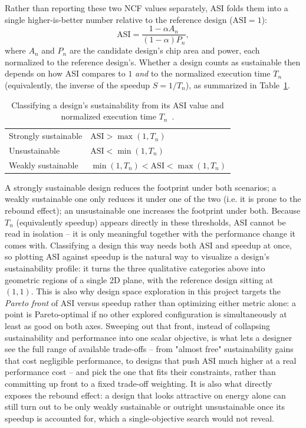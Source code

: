 \documentclass[12pt,a4paper,faculty=ea,language=en]{ugent-doc}
\begin{document}
Rather than reporting these two NCF values separately, ASI folds them into a single higher-is-better number relative to the reference design ($\mathrm{ASI} = 1$):
\begin{equation}
    \mathrm{ASI} = \frac{1 - \alpha A_n}{(1-\alpha) P_n},
\end{equation}
where $A_n$ and $P_n$ are the candidate design's chip area and power, each normalized to the reference design's. Whether a design counts as sustainable then depends on how ASI compares to $1$ \emph{and} to the normalized execution time $T_n$ (equivalently, the inverse of the speedup $S = 1/T_n$), as summarized in Table~\ref{tab:asi-regions}.

\begin{table}[H]
    \centering
    \begin{tabular}{ll}
        \toprule
        Strongly sustainable & $\mathrm{ASI} > \max(1, T_n)$ \\
        Unsustainable & $\mathrm{ASI} < \min(1, T_n)$ \\
        Weakly sustainable & $\min(1, T_n) < \mathrm{ASI} < \max(1, T_n)$ \\
        \bottomrule
    \end{tabular}
    \caption{Classifying a design's sustainability from its ASI value and normalized execution time $T_n$~\cite{asi2026}.}
    \label{tab:asi-regions}
\end{table}

A strongly sustainable design reduces the footprint under both scenarios; a weakly sustainable one only reduces it under one of the two (i.e. it is prone to the rebound effect); an unsustainable one increases the footprint under both. Because $T_n$ (equivalently speedup) appears directly in these thresholds, ASI cannot be read in isolation -- it is only meaningful together with the performance change it comes with. Classifying a design this way needs both ASI and speedup at once, so plotting ASI against speedup is the natural way to visualize a design's sustainability profile: it turns the three qualitative categories above into geometric regions of a single 2D plane, with the reference design sitting at $(1,1)$. This is also why design space exploration in this project targets the \emph{Pareto front} of ASI versus speedup rather than optimizing either metric alone: a point is Pareto-optimal if no other explored configuration is simultaneously at least as good on both axes. Sweeping out that front, instead of collapsing sustainability and performance into one scalar objective, is what lets a designer see the full range of available trade-offs -- from "almost free" sustainability gains that cost negligible performance, to designs that push ASI much higher at a real performance cost -- and pick the one that fits their constraints, rather than committing up front to a fixed trade-off weighting. It is also what directly exposes the rebound effect: a design that looks attractive on energy alone can still turn out to be only weakly sustainable or outright unsustainable once its speedup is accounted for, which a single-objective search would not reveal.
\end{document}
